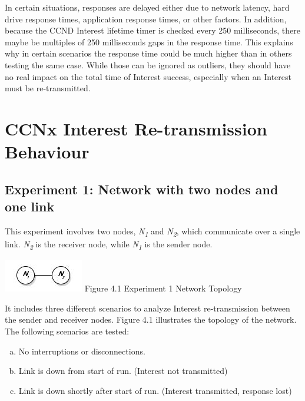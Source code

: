 \documentclass[a4paper,12pt]{report}      %
\begin{document}
In certain situations, responses are delayed either due to network latency, hard drive response times,
application response times, or other factors. In addition, because the CCND Interest lifetime timer is
checked every 250 milliseconds, there maybe be multiples of 250 milliseconds gaps in the response time. This explains why
in certain scenarios the response time could be much higher than in others testing the same case. While
those can be ignored as outliers, they should have no real impact on the total time of Interest success,
especially when an Interest must be re-transmitted.

\section{CCNx Interest Re-transmission Behaviour}

\subsection{Experiment 1: Network with two nodes and one link}

This experiment involves two nodes, \emph{N\textsubscript{1}} and \emph{N\textsubscript{2}}, which communicate over a single link. \emph{N\textsubscript{2}} is the receiver node, while \emph{N\textsubscript{1}} is the sender node.

\begin{center}
\includegraphics[scale=0.75]{exp1topo.jpg}\newline
Figure 4.1 Experiment 1 Network Topology\end{center}

\noindent It includes three different scenarios to analyze Interest re-transmission between the sender and receiver
nodes. Figure 4.1 illustrates the topology of the network. The following scenarios are tested:

\begin{enumerate}[(a)]
\item No interruptions or disconnections.
\item Link is down from start of run. (Interest not transmitted)
\item Link is down shortly after start of run. (Interest transmitted, response lost)
\end{enumerate}
\end{document}
